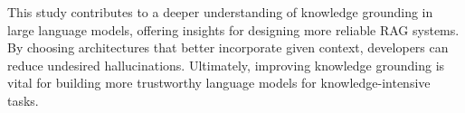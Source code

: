 % 
% 

This study contributes to a deeper understanding of knowledge grounding in large language models, offering insights for designing more reliable RAG systems.
By choosing architectures that better incorporate given context, developers can reduce undesired hallucinations.
Ultimately, improving knowledge grounding is vital for building more trustworthy language models for knowledge-intensive tasks.
